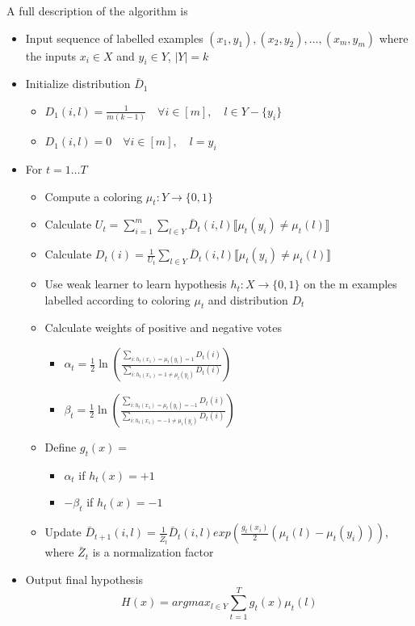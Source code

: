 \documentclass[11pt]{article}
\begin{document}
A full description of the algorithm is
\begin{itemize}
\item Input sequence of labelled examples $(x_1, y_1), (x_2, y_2), \ldots, (x_m, y_m)$ where the inputs $x_i \in X$ and $y_i \in Y$, $|Y| = k$
\item Initialize distribution $\bar D_1$
\begin{itemize}
\item $D_1(i, l) = \frac{1}{m(k-1)}\quad \forall i \in [m],\quad l \in Y - \{y_i\}$
\item $D_1(i, l) = 0 \quad \forall i \in [m],\quad l = y_i$
\end{itemize}
\item For $t =  1 \ldots T$
\begin{itemize}
\item Compute a coloring $\mu_t : Y \rightarrow \{0,1\}$
\item Calculate $U_t = \sum_{i=1}^m \sum_{l \in Y} \bar D_t(i,l) \llbracket \mu_t(y_i) \neq \mu_t(l)\rrbracket$
\item Calculate $D_t(i) = \frac{1}{U_t} \sum_{l \in Y} \bar D_t(i,l) \llbracket \mu_t(y_i) \neq \mu_t(l)\rrbracket$
\item Use weak learner to learn hypothesis $h_t : X \rightarrow \{0,1\}$ on the m examples labelled according to coloring $\mu_t$ and distribution $D_t$
\item Calculate weights of positive and negative votes
\begin{itemize}
\item $\alpha_t = \frac{1}{2} \ln \left(\frac{\sum_{i:h_t(x_1) = \mu_t(y_i) = 1} D_t(i)}{\sum_{i:h_t(x_1) = 1 \neq \mu_t(y_i) } D_t(i)} \right)$
\item $\beta_t = \frac{1}{2} \ln \left(\frac{\sum_{i:h_t(x_1) = \mu_t(y_i) = -1} D_t(i)}{\sum_{i:h_t(x_1) = -1 \neq \mu_t(y_i) } D_t(i)} \right)$
\end{itemize}
\item Define $g_t(x) = $
\begin{itemize}
\item $\alpha_t$ if $h_t(x) = +1$
\item $-\beta_t$ if $h_t(x) = -1$
\end{itemize}
\item Update $\bar D_{t+1}(i,l) = \frac{1}{\bar Z_t} \bar D_t(i,l) exp(\frac{g_t(x_i)}{2}(\mu_t(l)-\mu_t(y_i)))$, where $\bar Z_t$ is a normalization factor
\end{itemize}
\item Output final hypothesis $$H(x) = argmax_{l \in Y} \sum_{t=1}^T g_t(x)\mu_t(l)$$
\end{itemize}
\end{document}
